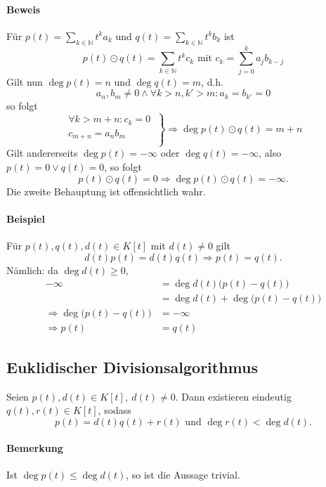 \paragraph{Beweis}
	Für $ p(t) = \sum_{k\in\mathbb{N}}t^ka_k $ und $ q(t) = \sum_{k\in\mathbb{N}}t^kb_k $ ist
		\[ p(t)\odot q(t) = \sum_{k\in\mathbb{N}}t^kc_k \text{ mit } c_k = \sum_{j=0}^{k}a_jb_{k-j} \]
	Gilt nun $ \deg p(t) = n $ und $ \deg q(t) = m $, d.h.
		\[ a_n,b_m \neq 0 \land \forall k>n, k'>m:a_k = b_{k'}=0 \] 
	so folgt
		\[ \left.
		\begin{aligned}
		\forall k>m+n : c_k = 0\ \\
		        c_{m+n} = a_nb_m\ \\
		\end{aligned}
		 \right\}
		\Rightarrow \deg p(t)\odot q(t) = m+n \]
	Gilt andererseits $ \deg p(t) = -\infty $ oder $ \deg q(t) = -\infty $, also $ p(t) = 0 \lor q(t) = 0 $,
	so folgt
		\[ p(t)\odot q(t) = 0 \Rightarrow \deg p(t)\odot q(t) = -\infty. \]
	Die zweite Behauptung ist offensichtlich wahr.


\paragraph{Beispiel}
	Für $ p(t),q(t),d(t)\in K[t] $ mit $ d(t)\neq 0 $ gilt
		\[ d(t)p(t) = d(t)q(t)\Rightarrow p(t)=q(t). \]
	Nämlich: da $ \deg d(t) \geq 0$,
		\begin{align*}
			-\infty &= \deg d(t)\big(p(t)-q(t)\big)\\
			&= \deg d(t)+ \deg\big(p(t)-q(t)\big)\\
			\Rightarrow \deg\big(p(t)-q(t)\big) &= -\infty\\
			\Rightarrow p(t)&=q(t)
		\end{align*}
\subsection{Euklidischer Divisionsalgorithmus}
	\begin{Satz}
	Seien $ p(t), d(t) \in K[t],\ d(t) \neq 0$. Dann existieren eindeutig $ q(t), r(t) \in K[t] $, sodass
		\[ p(t)= d(t)q(t) + r(t) \text{ und } \deg r(t) < \deg d(t). \]
	\end{Satz}
\paragraph{Bemerkung}
	Ist $ \deg p(t)\leq \deg d(t) $, so ist die Aussage trivial.
